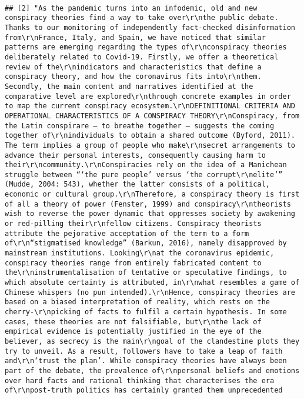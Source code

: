 \documentclass[
]{book}
\begin{document}
\begin{verbatim}
                                                                                                                                                                                                                                                                                                                                                                                                                                                                                                                                                                                                                                                                                      
## [2] "As the pandemic turns into an infodemic, old and new conspiracy theories find a way to take over\r\nthe public debate. Thanks to our monitoring of independently fact-checked disinformation from\r\nFrance, Italy, and Spain, we have noticed that similar patterns are emerging regarding the types of\r\nconspiracy theories deliberately related to Covid-19. Firstly, we offer a theoretical review of the\r\nindicators and characteristics that define a conspiracy theory, and how the coronavirus fits into\r\nthem. Secondly, the main content and narratives identified at the comparative level are explored\r\nthrough concrete examples in order to map the current conspiracy ecosystem.\r\nDEFINITIONAL CRITERIA AND OPERATIONAL CHARACTERISTICS OF A CONSPIRACY THEORY\r\nConspiracy, from the Latin conspirare – to breathe together – suggests the coming together of\r\nindividuals to obtain a shared outcome (Byford, 2011). The term implies a group of people who make\r\nsecret arrangements to advance their personal interests, consequently causing harm to their\r\ncommunity.\r\nConspiracies rely on the idea of a Manichean struggle between “‘the pure people’ versus ‘the corrupt\r\nelite’” (Mudde, 2004: 543), whether the latter consists of a political, economic or cultural group.\r\nTherefore, a conspiracy theory is first of all a theory of power (Fenster, 1999) and conspiracy\r\ntheorists wish to reverse the power dynamic that oppresses society by awakening or red-pilling their\r\nfellow citizens. Conspiracy theorists attribute the pejorative acceptation of the term to a form of\r\n“stigmatised knowledge” (Barkun, 2016), namely disapproved by mainstream institutions. Looking\r\nat the coronavirus epidemic, conspiracy theories range from entirely fabricated content to the\r\ninstrumentalisation of tentative or speculative findings, to which absolute certainty is attributed, in\r\nwhat resembles a game of Chinese whispers (no pun intended).\r\nHence, conspiracy theories are based on a biased interpretation of reality, which rests on the cherry-\r\npicking of facts to fulfil a certain hypothesis. In some cases, these theories are not falsifiable, but\r\nthe lack of empirical evidence is potentially justified in the eye of the believer, as secrecy is the main\r\ngoal of the clandestine plots they try to unveil. As a result, followers have to take a leap of faith and\r\n‘trust the plan’. While conspiracy theories have always been part of the debate, the prevalence of\r\npersonal beliefs and emotions over hard facts and rational thinking that characterises the era of\r\npost-truth politics has certainly granted them unprecedented 
\end{verbatim}
\end{document}
